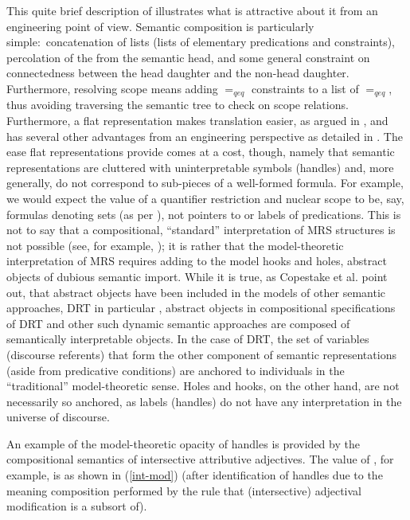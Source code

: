 \documentclass[output=paper]{langsci/langscibook}
\begin{document}
This quite brief description of  illustrates what is attractive about it from an engineering point of view. Semantic composition is particularly simple:\ concatenation of lists (lists of elementary predications and constraints), percolation of the  from the semantic head, and some general constraint on connectedness between the head daughter and the non-head daughter. Furthermore, resolving scope means adding $=_{qeq}$ constraints to a list of $=_{qeq}$, thus avoiding traversing the semantic tree to check on scope relations. Furthermore, a flat representation makes translation easier, as argued in \citet{Copestakeetal1995}, and has several other advantages from an engineering perspective as detailed in \citet{Copestake2009}. The ease flat representations provide comes at a cost, though, namely that semantic representations are cluttered with uninterpretable symbols (handles) and, more generally, do not correspond to sub-pieces of a well-formed formula. For example, we would expect the value of a quantifier restriction and nuclear scope to be, say, formulas denoting sets (as per \citealt{BarwiseandCooper1981}), not pointers to or labels of predications. This is not to say that a compositional, ``standard'' interpretation of MRS structures is not possible (see, for example, \citealt{Copestakeetal2001}); it is rather that the model-theoretic interpretation of MRS requires adding to the model hooks and holes, abstract objects of dubious semantic import. While it is true, as Copestake et al. point out, that abstract objects have been included in the models of other semantic approaches, DRT in particular \citep{Zeevat1989}, abstract objects in compositional specifications of DRT and other such dynamic semantic approaches are composed of semantically interpretable objects. In the case of DRT, the set of variables (discourse referents) that form the other component of semantic representations (aside from predicative conditions) are anchored to individuals in the ``traditional'' model-theoretic sense. Holes and hooks, on the other hand, are not necessarily so anchored, as labels (handles) do not have any interpretation in the universe of discourse.


An example of the model-theoretic opacity of handles is provided by the compositional semantics of intersective attributive adjectives. The  value of , for example, is as shown in (\ref{int-mod}) (after identification of handles due to the meaning composition performed by the  rule that (intersective) adjectival modification is a subsort of).
\end{document}
